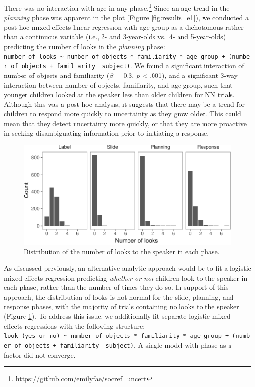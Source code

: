 \documentclass[a4paper,man,apacite,floatsintext]{apa6}
\newenvironment{CodeChunk}{}{}
\begin{document}
There was no interaction with age in any phase.\footnote{\url{https://github.com/emilyfae/socref_uncert}}
Since an age trend in the \emph{planning} phase was apparent in the plot
(Figure \ref{fig:results_e1}), we conducted a post-hoc mixed-effects
linear regression with age group as a dichotomous rather than a
continuous variable (i.e., 2- and 3-year-olds vs.~4- and 5-year-olds)
predicting the number of looks in the \emph{planning} phase:
\texttt{number\ of\ looks\ \textasciitilde{}\ number\ of\ objects\ *\ familiarity\ *\ age\ group\ +\ (number\ of\ objects\ +\ familiarity\ \textbar{}\ subject)}.
We found a significant interaction of number of objects and familiarity
(\(\beta\) = 0.3, \emph{p} \textless{} .001), and a significant 3-way
interaction between number of objects, familiarity, and age group, such
that younger children looked at the speaker less than older children for
NN trials. Although this was a post-hoc analysis, it suggests that there
may be a trend for children to respond more quickly to uncertainty as
they grow older. This could mean that they detect uncertainty more
quickly, or that they are more proactive in seeking disambiguating
information prior to initiating a response.

\begin{CodeChunk}
\begin{figure}[b]

{\centering \includegraphics{figs/hist_e1-1} 

}

\caption[Distribution of the number of looks to the speaker in each phase]{Distribution of the number of looks to the speaker in each phase.}\label{fig:hist_e1}
\end{figure}
\end{CodeChunk}

As discussed previously, an alternative analytic approach would be to
fit a logistic mixed-effects regression predicting \emph{whether or not}
children look to the speaker in each phase, rather than the number of
times they do so. In support of this approach, the distribution of looks
is not normal for the slide, planning, and response phases, with the
majority of trials containing no looks to the speaker (Figure
\ref{fig:hist_e1}). To address this issue, we additionally fit separate
logistic mixed-effects regressions with the following structure:
\texttt{look\ (yes\ or\ no)\ \textasciitilde{}\ number\ of\ objects\ *\ familiarity\ *\ age\ group\ +\ (number\ of\ objects\ +\ familiarity\ \textbar{}\ subject)}.
A single model with phase as a factor did not converge.
\end{document}
